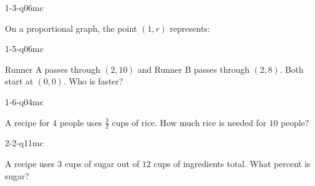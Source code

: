
\begin{practiceQuestion}{1-3-q06}{mc}
\begin{questionText}
On a proportional graph, the point $(1, r)$ represents:
\end{questionText}
\end{practiceQuestion}

\begin{practiceQuestion}{1-5-q06}{mc}
\begin{questionText}
Runner A passes through $(2, 10)$ and Runner B passes through $(2, 8)$. Both start at $(0, 0)$. Who is faster?
\end{questionText}
\end{practiceQuestion}

\begin{practiceQuestion}{1-6-q04}{mc}
\begin{questionText}
A recipe for $4$ people uses $\frac{3}{2}$ cups of rice. How much rice is needed for $10$ people?
\end{questionText}
\end{practiceQuestion}

\begin{practiceQuestion}{2-2-q11}{mc}
\begin{questionText}
A recipe uses $3$ cups of sugar out of $12$ cups of ingredients total. What percent is sugar?
\end{questionText}
\end{practiceQuestion}

